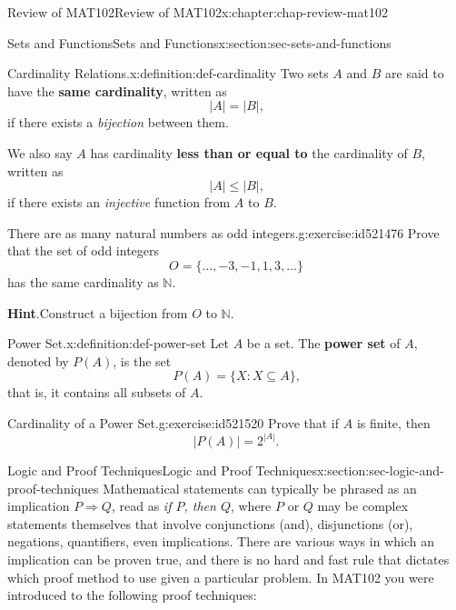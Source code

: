 \documentclass[oneside,10pt,]{book}
\newcommand{\blocktitlefont}{\relax}
\newcommand{\terminology}[1]{\textbf{#1}}
\numberwithin{equation}{section}
\begin{document}
\begin{chapterptx}{Review of MAT102}{}{Review of MAT102}{}{}{x:chapter:chap-review-mat102}
\begin{sectionptx}{Sets and Functions}{}{Sets and Functions}{}{}{x:section:sec-sets-and-functions}
\begin{definition}{Cardinality Relations.}{x:definition:def-cardinality}
\label{g:notation:id521403}\label{g:notation:id521377} Two sets \(A\) and \(B\) are said to have the \terminology{same cardinality}, written as%
\begin{equation*}
|A| = |B|\text{,}
\end{equation*}
if there exists a \emph{bijection} between them.%
\par
We also say \(A\) has cardinality \terminology{less than or equal to} the cardinality of \(B\), written as%
\begin{equation*}
|A| \leq |B|\text{,}
\end{equation*}
if there exists an \emph{injective} function from \(A\) to \(B\).%
\end{definition}
\begin{inlineexercise}{There are as many natural numbers as odd integers.}{g:exercise:id521476}%
Prove that the set of odd integers%
\begin{equation*}
O = \{\ldots,-3,-1,1,3,\ldots\}
\end{equation*}
has the same cardinality as \(\mathbb{N}\).%
\par\smallskip%
\noindent\textbf{\blocktitlefont Hint}.\hypertarget{g:hint:id521460}{}\quad{}Construct a bijection from \(O\) to \(\mathbb{N}\).%
\end{inlineexercise}%
\begin{definition}{Power Set.}{x:definition:def-power-set}%
\label{g:notation:id521514} Let \(A\) be a set. The \terminology{power set} of \(A\), denoted by \(P(A)\), is the set%
\begin{equation*}
P(A) = \{X : X \subseteq A\}\text{,}
\end{equation*}
that is, it contains all subsets of \(A\).%
\end{definition}
\begin{inlineexercise}{Cardinality of a Power Set.}{g:exercise:id521520}%
Prove that if \(A\) is finite, then%
\begin{equation*}
|P(A)| = 2^{|A|}\text{.}
\end{equation*}
%
\end{inlineexercise}%
\end{sectionptx}
%
%
\typeout{************************************************}
\typeout{************************************************}
%
\begin{sectionptx}{Logic and Proof Techniques}{}{Logic and Proof Techniques}{}{}{x:section:sec-logic-and-proof-techniques}
Mathematical statements can typically be phrased as an implication \(P \Rightarrow Q\),  read as \emph{if \(P\), then \(Q\)}, where \(P\) or \(Q\) may be complex statements themselves that involve conjunctions (and), disjunctions (or), negations, quantifiers, even implications. There are various ways in which an implication can be proven true, and there is no hard and fast rule that dictates which proof method to use given a particular problem. In MAT102 you were introduced to the following proof techniques:%

\end{sectionptx}
\end{chapterptx}
\end{document}
